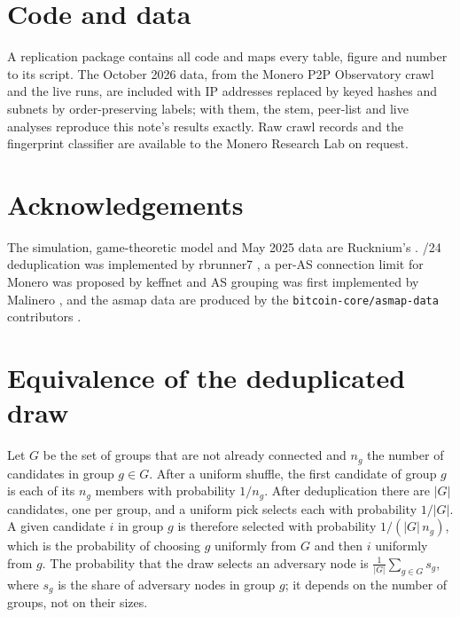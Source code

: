 \documentclass[english]{mrl}
\theoremstyle{plain}
\begin{document}
\section*{Code and data}

A replication package contains all code and maps every table, figure and number to its script. The October 2026 data, from the Monero P2P Observatory crawl \cite{Observatory} and the live runs, are included with IP addresses replaced by keyed hashes and subnets by order-preserving labels; with them, the stem, peer-list and live analyses reproduce this note's results exactly. Raw crawl records and the fingerprint classifier are available to the Monero Research Lab on request.

\section*{Acknowledgements}

The simulation, game-theoretic model and May 2025 data are Rucknium's \cite{Rucknium2025,xmrpeers}. /24 deduplication was implemented by rbrunner7 \cite{MoneroPR9939}, a per-AS connection limit for Monero was proposed by keffnet \cite{MoneroIssue7090} and AS grouping was first implemented by Malinero \cite{MoneroPR7935}, and the asmap data are produced by the \texttt{bitcoin-core/asmap-data} contributors \cite{AsmapData}.

\begin{singlespace}

\end{singlespace}

\appendix

\section{Equivalence of the deduplicated draw\label{sec:appendix-draw}}

Let $G$ be the set of groups that are not already connected and $n_{g}$ the number of candidates in group $g \in G$. After a uniform shuffle, the first candidate of group $g$ is each of its $n_{g}$ members with probability $1/n_{g}$. After deduplication there are $|G|$ candidates, one per group, and a uniform pick selects each with probability $1/|G|$. A given candidate $i$ in group $g$ is therefore selected with probability $1/(|G|\, n_{g})$, which is the probability of choosing $g$ uniformly from $G$ and then $i$ uniformly from $g$. The probability that the draw selects an adversary node is $\frac{1}{|G|}\sum_{g\in G} s_{g}$, where $s_{g}$ is the share of adversary nodes in group $g$; it depends on the number of groups, not on their sizes.
\end{document}
